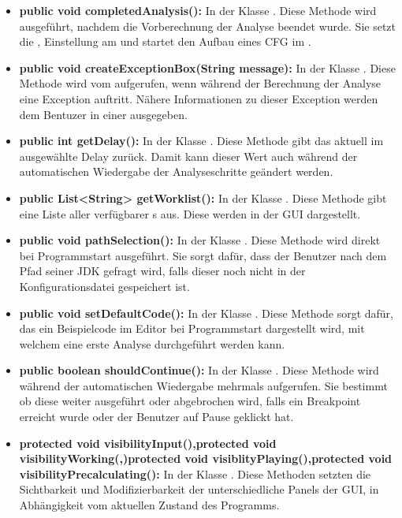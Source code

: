 \begin{itemize}
	\item \textbf{public void completedAnalysis():} In der Klasse . Diese Methode wird ausgeführt, nachdem die Vorberechnung der Analyse beendet wurde. Sie setzt die , Einstellung am  und startet den Aufbau eines CFG im .
	
	\item \textbf{public void createExceptionBox(String message):} In der Klasse . Diese Methode wird vom  aufgerufen, wenn während der Berechnung der Analyse eine Exception auftritt. Nähere Informationen zu dieser Exception werden dem Bentuzer in einer  ausgegeben.
	
	\item \textbf{public int getDelay():} In der Klasse . Diese Methode gibt das aktuell im  ausgewählte Delay zurück. Damit kann dieser Wert auch während der automatischen Wiedergabe der Analyseschritte geändert werden.
	
	\item \textbf{public List<String> getWorklist():} In der Klasse . Diese Methode gibt eine Liste aller verfügbarer s aus. Diese werden in der GUI dargestellt.
	
	\item \textbf{public void pathSelection():} In der Klasse . Diese Methode wird direkt bei Programmstart ausgeführt. Sie sorgt dafür, dass der Benutzer nach dem Pfad seiner JDK gefragt wird, falls dieser noch nicht in der Konfigurationsdatei gespeichert ist. 
	
	\item \textbf{public void setDefaultCode():} In der Klasse . Diese Methode sorgt dafür, das ein Beispielcode im Editor bei Programmstart dargestellt wird, mit welchem eine erste Analyse durchgeführt werden kann.
	
	\item \textbf{public boolean shouldContinue():} In der Klasse . Diese Methode wird während der automatischen Wiedergabe mehrmals aufgerufen. Sie bestimmt ob diese weiter ausgeführt oder abgebrochen wird, falls ein Breakpoint erreicht wurde oder der Benutzer auf Pause geklickt hat.
	
	\item \textbf{protected void visibilityInput(),}\textbf{protected void visibilityWorking(,)}\textbf{protected void visiblityPlaying(),}\textbf{protected void visibilityPrecalculating():} In der Klasse . Diese Methoden setzten die Sichtbarkeit und Modifizierbarkeit der unterschiedliche Panels der GUI, in Abhängigkeit vom aktuellen Zustand des Programms.
\end{itemize}

